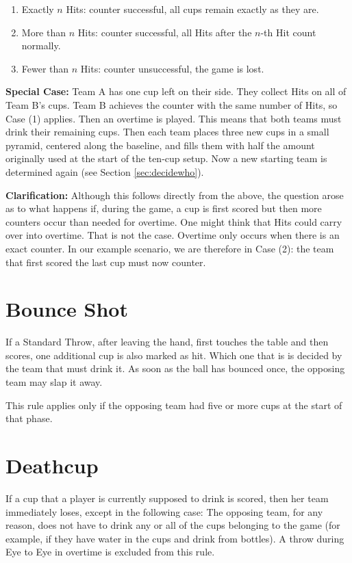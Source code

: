\documentclass[a5paper, 12pt]{book}
\begin{document}
\begin{enumerate}
    \item Exactly \( n \) Hits: counter successful, all cups remain exactly as they are.
    \item More than \( n \) Hits: counter successful, all Hits after the \( n \)-th Hit count normally.
    \item Fewer than \( n \) Hits: counter unsuccessful, the game is lost.
\end{enumerate}

\textbf{Special Case:}  
Team A has one cup left on their side.  
They collect Hits on all of Team B’s cups.  
Team B achieves the counter with the same number of Hits, so Case (1) applies.  
Then an overtime is played.  
This means that both teams must drink their remaining cups.  
Then each team places three new cups in a small pyramid, centered along the baseline, and fills them with half the amount originally used at the start of the ten-cup setup.  
Now a new starting team is determined again (see Section \ref{sec:decidewho}).

\textbf{Clarification:}  
Although this follows directly from the above, the question arose as to what happens if, during the game, a cup is first scored but then more counters occur than needed for overtime.  
One might think that Hits could carry over into overtime.  
That is not the case.  
Overtime only occurs when there is an exact counter.  
In our example scenario, we are therefore in Case (2): the team that first scored the last cup must now counter.

\section{Bounce Shot}\label{sec:aufsetzer}
If a Standard Throw, after leaving the hand, first touches the table and then scores, one additional cup is also marked as hit.  
Which one that is is decided by the team that must drink it.  
As soon as the ball has bounced once, the opposing team may slap it away.

This rule applies only if the opposing team had five or more cups at the start of that phase.

\section{Deathcup}\label{sec:deathcup}
If a cup that a player is currently supposed to drink is scored, then her team immediately loses, except in the following case:  
The opposing team, for any reason, does not have to drink any or all of the cups belonging to the game (for example, if they have water in the cups and drink from bottles).  
A throw during Eye to Eye in overtime is excluded from this rule.
\end{document}
